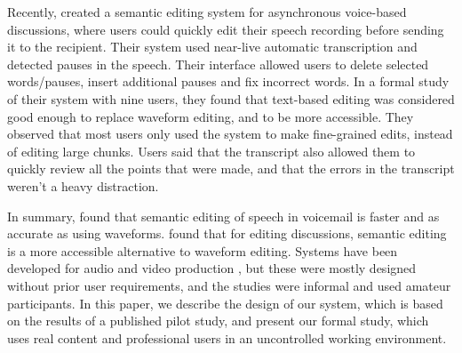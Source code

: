 Recently, \citet{Sivaraman2016} created a semantic editing system for asynchronous voice-based discussions, where users
could quickly edit their speech recording before sending it to the recipient.  Their system used near-live automatic
transcription and detected pauses in the speech. Their interface allowed users to delete selected words/pauses, insert
additional pauses and fix incorrect words.  In a formal study of their system with nine users, they found that
text-based editing was considered good enough to replace waveform editing, and to be more accessible. They observed
that most users only used the system to make fine-grained edits, instead of editing large chunks.  Users said that the
transcript also allowed them to quickly review all the points that were made, and that the errors in the transcript
weren't a heavy distraction.






In summary, \citet{Whittaker2004} found that semantic editing of speech in voicemail is faster and as accurate as using
waveforms.  \citet{Sivaraman2016} found that for editing discussions, semantic editing is a more accessible alternative
to waveform editing. Systems have been developed for audio and video production
\citep{Casares2002,Berthouzoz2012,Rubin2013}, but these were mostly designed without prior user requirements, and the
studies were informal and used amateur participants. In this paper, we describe the design of our system, which is
based on the results of a published pilot study, and present our formal study, which uses real content and professional
users in an uncontrolled working environment.

